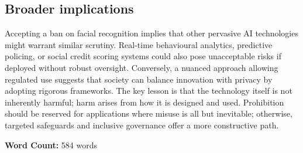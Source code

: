 \documentclass[11pt,twoside]{article}
\begin{document}
\subsection{Broader implications}
Accepting a ban on facial recognition implies that other pervasive AI technologies might warrant similar scrutiny.  Real-time behavioural analytics, predictive policing, or social credit scoring systems could also pose unacceptable risks if deployed without robust oversight.  Conversely, a nuanced approach allowing regulated use suggests that society can balance innovation with privacy by adopting rigorous frameworks.  The key lesson is that the technology itself is not inherently harmful; harm arises from how it is designed and used.  Prohibition should be reserved for applications where misuse is all but inevitable; otherwise, targeted safeguards and inclusive governance offer a more constructive path.

\vspace{1em}

\noindent\textbf{Word Count:} 584 words
\end{document}
